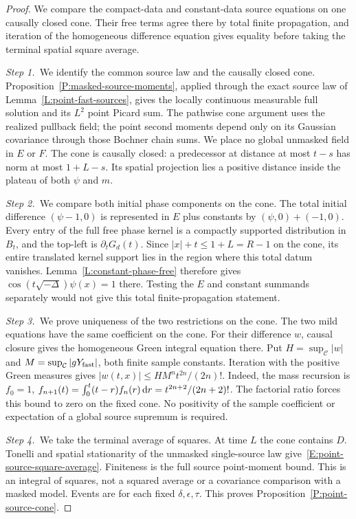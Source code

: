 \begin{proof}
  We compare the compact-data and constant-data source equations on one
  causally closed cone. Their free terms agree there by total finite
  propagation, and iteration of the homogeneous difference equation gives
  equality before taking the terminal spatial square average.


  \medskip
  \noindent\textit{Step 1.~}We identify the common source law and the causally
  closed cone.
  Proposition~\ref{P:masked-source-moments}, applied through the exact source
  law of Lemma~\ref{L:point-fast-sources}, gives the locally continuous
  measurable full solution and its $L^2$ point Picard sum. The pathwise cone
  argument uses the realized pullback field; the point second moments depend
  only on its Gaussian covariance through those Bochner chain sums. We place no
  global unmasked field in $E$ or $F$. The cone is causally closed: a
  predecessor at distance at most $t-s$ has norm at most $1+L-s$. Its spatial
  projection lies a positive distance inside the plateau of both $\psi$ and $m$.


  \medskip
  \noindent\textit{Step 2.~}We compare both initial phase components on the
  cone.
  The total initial difference $(\psi-1,0)$ is represented in $E$ plus constants
  by $(\psi,0)+(-1,0)$. Every entry of the full free phase kernel is a compactly
  supported distribution in $B_t$, and the top-left is $\partial_tG_d(t)$. Since
  $|x|+t \le 1+L = R-1$ on the cone, its entire translated kernel support lies
  in the region where this total datum vanishes.
  Lemma~\ref{L:constant-phase-free} therefore gives
  $\cos(t\sqrt{-\Delta})\psi(x) = 1$ there. Testing the $E$ and constant
  summands separately would not give this total finite-propagation statement.


  \medskip
  \noindent\textit{Step 3.~}We prove uniqueness of the two restrictions on the
  cone.
  The two mild equations have the same coefficient on the cone. For their
  difference $w$, causal closure gives the homogeneous Green integral equation
  there. Put $H = \sup_{\mathcal{C}}|w|$ and $M = \sup_{\mathcal{C}}|gY_{\rm
  fast}|$, both finite sample constants. Iteration with the positive Green
  measures gives $|w(t,x)| \le HM^nt^{2n}/(2n)!$. Indeed, the mass recursion is
  $f_0 = 1$, $f_{n+1}(t) = \int_0^t(t-r)f_n(r)\,\mathrm{d} r = t^{2n+2}/(2n+2)!$. The
  factorial ratio forces this bound to zero on the fixed cone. No positivity of
  the sample coefficient or expectation of a global source supremum is required.


  \medskip
  \noindent\textit{Step 4.~}We take the terminal average of squares.
  At time $L$ the cone contains $D$. Tonelli and spatial stationarity of the
  unmasked single-source law give~\eqref{E:point-source-square-average}.
  Finiteness is the full source point-moment bound. This is an integral of
  squares, not a squared average or a covariance comparison with a masked model.
  Events are for each fixed $\delta,\epsilon,\tau$. This proves
  Proposition~\ref{P:point-source-cone}.
\end{proof}


